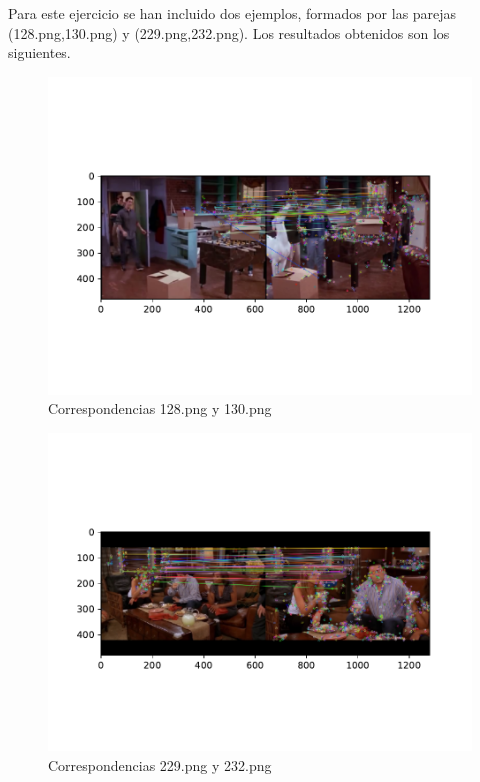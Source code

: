 	\vspace{0.06in}
	Para este ejercicio se han incluido dos ejemplos, formados por las parejas (128.png,130.png) y (229.png,232.png). Los resultados obtenidos son los siguientes.
	
	\vspace{0.06in}
	
	\begin{figure}[H]
		\centering
		\includegraphics[scale=0.75]{./imagenes/eje1_1.pdf}
		\caption{Correspondencias 128.png y 130.png}
		\label{fig:ejer1_1}
	\end{figure}

	\begin{figure}[H]
		\centering
		\includegraphics[scale=0.8]{./imagenes/eje1_2.pdf}
		\caption{Correspondencias 229.png y 232.png}
		\label{fig:ejer1_2}
	\end{figure}

